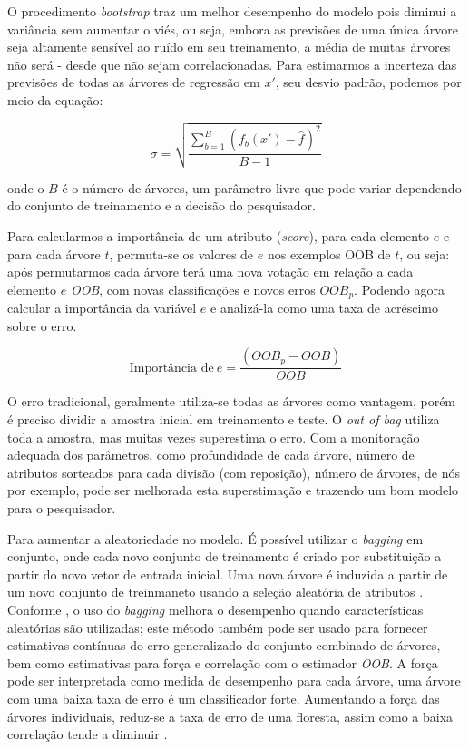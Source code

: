 \documentclass[
  openany]{book}
\begin{document}
O procedimento \emph{bootstrap} traz um melhor desempenho do modelo pois diminui a variância sem aumentar o viés, ou seja, embora as previsões de uma única árvore seja altamente sensível ao ruído em seu treinamento, a média de muitas árvores não será - desde que não sejam correlacionadas. Para estimarmos a incerteza das previsões de todas as árvores de regressão em \(x'\), seu desvio padrão, podemos por meio da equação:

\begin{equation}
\sigma = \sqrt{\frac{\sum^B_{b=1}(f_b(x')-\hat{f})^2}{B-1}}
\label{eq:desviorf}
\end{equation}

onde o \(B\) é o número de árvores, um parâmetro livre que pode variar dependendo do conjunto de treinamento e a decisão do pesquisador.

Para calcularmos a importância de um atributo (\emph{score}), para cada elemento \(e\) e para cada árvore \(t\), permuta-se os valores de \(e\) nos exemplos OOB de \(t\), ou seja: após permutarmos cada árvore terá uma nova votação em relação a cada elemento \(e\) \emph{OOB}, com novas classificações e novos erros \(OOB_p\). Podendo agora calcular a importância da variável \(e\) e analizá-la como uma taxa de acréscimo sobre o erro.

\begin{equation}
\mbox{Importância de} \ e = \frac{(OOB_p-OOB)}{OOB}
\label{eq:impc}
\end{equation}

O erro tradicional, geralmente utiliza-se todas as árvores como vantagem, porém é preciso dividir a amostra inicial em treinamento e teste. O \emph{out of bag} utiliza toda a amostra, mas muitas vezes superestima o erro. Com a monitoração adequada dos parâmetros, como profundidade de cada árvore, número de atributos sorteados para cada divisão (com reposição), número de árvores, de nós por exemplo, pode ser melhorada esta superstimação e trazendo um bom modelo para o pesquisador.

Para aumentar a aleatoriedade no modelo. É possível utilizar o \emph{bagging} em conjunto, onde cada novo conjunto de treinamento é criado por substituição a partir do novo vetor de entrada inicial. Uma nova árvore é induzida a partir de um novo conjunto de treinmaneto usando a seleção aleatória de atributos \citep{gomez2012random}. Conforme \citep{breiman2001random}, o uso do \emph{bagging} melhora o desempenho quando características aleatórias são utilizadas; este método também pode ser usado para fornecer estimativas contínuas do erro generalizado do conjunto combinado de árvores, bem como estimativas para força e correlação com o estimador \emph{OOB}. A força pode ser interpretada como medida de desempenho para cada árvore, uma árvore com uma baixa taxa de erro é um classificador forte. Aumentando a força das árvores individuais, reduz-se a taxa de erro de uma floresta, assim como a baixa correlação tende a diminuir \citep{oshiro2013abordagem}.
\end{document}
